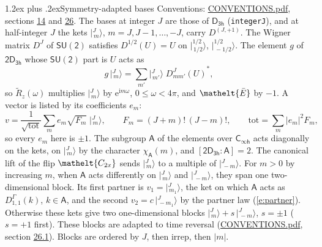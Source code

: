 \documentclass[10pt,a4paper]{article}
\makeatletter
\renewcommand\section{\@startsection{section}{1}{\z@}{-3ex plus -1ex minus -.2ex}%
  {1.2ex plus .2ex}{\normalfont\large\sffamily\bfseries\color{parttitle}}}
\numberwithin{equation}{section}
\newcommand{\eltfont}[1]{{\let\sigma\eltsigma\mathelt{#1}}}
\newcommand{\grp}[1]{\mathsf{#1}}
\newcommand{\elt}[1]{\eltfont{#1}}
\newcommand{\grpindex}[2]{[#1 : #2]}
\newcommand{\iunit}{\mathrm{i}}
\newcommand{\expe}{\mathrm{e}}
\newcommand{\irrJp}[2]{D^{(#1,#2)}}
\newcommand{\repD}[1]{D^{#1}}
\newcommand{\wignerD}[1]{D^{#1}}
\newcommand{\chiA}{\chi_{\grp{A}}}
\newcommand{\conj}[1]{{#1}^{*}}
\newcommand{\jm}[2]{\bigl\lvert{}^{#1}_{\,#2}\bigr\rangle}
\newcommand{\barred}[1]{\bar{#1}}
\newcommand{\lift}[1]{\tilde{#1}}
\makeatother
\begin{document}
\section{Symmetry-adapted bases}\label{s:bases}
Conventions: \href{../../CONVENTIONS.pdf}{CONVENTIONS.pdf}, sections \href{../../../rotation/CONVENTIONS.pdf\#conv.14}{14} and \href{../../CONVENTIONS.pdf\#conv.26}{26}.
\leavevmode\label{n:index.m}\label{n:vector.ket}The bases at integer $J$ are those of \href{../../../rotation/data/pdf/D3h.pdf}{$\grp{D_{3h}}$} (\texttt{integerJ}), and at half-integer $J$ the kets $\jm{J}{m}$, $m = J, J-1, \dots, -J$, carry $\irrJp{J}{+1}$. \label{n:matrix.wigner}The Wigner matrix $\wignerD{J}$ of $\grp{SU(2)}$ satisfies $\wignerD{1/2}(U) = U$ on $\jm{1/2}{1/2}$, $\jm{1/2}{-1/2}$. The element $g$ of $\grp{2D_{3h}}$ whose $\grp{SU(2)}$ part is $U$ acts as
\begin{equation}\label{e:action}g\,\jm{J}{m} = \sum_{m'} \jm{J}{m'}\; \conj{\wignerD{J}_{m m'}(U)},\end{equation}
so $\lift{R}_{z}(\omega)$ multiplies $\jm{J}{m}$ by $\expe^{\iunit m\omega}$, $0 \le \omega < 4\pi$, and $\elt{\barred{E}}$ by $-1$. \label{n:index.ketcoefficient}\label{n:vector.basis.symmetry}\label{n:index.ketweight}\label{n:index.total}A vector is listed by its coefficients $e_m$:
\begin{equation}\label{e:ket}v = \frac{1}{\sqrt{\mathrm{tot}}}\sum_m e_m\sqrt{F_m}\;\jm{J}{m},\qquad F_m = (J+m)!\,(J-m)!,\qquad \mathrm{tot} = \sum_m |e_m|^2F_m,\end{equation}
so every $e_m$ here is $\pm 1$.
\leavevmode\label{n:group.A}\label{n:function.character.abelian}The subgroup $\grp{A}$ of the elements over $\grp{C_{\infty h}}$ acts diagonally on the kets, on $\jm{J}{m}$ by the character $\chiA(m)$, and $\grpindex{\grp{2D_{3h}}}{\grp{A}} = 2$. The canonical lift of the flip $\elt{C_{2x}}$ sends $\jm{J}{m}$ to a multiple of $\jm{J}{-m}$. For $m > 0$ by increasing $m$, when $\grp{A}$ acts differently on $\jm{J}{m}$ and $\jm{J}{-m}$, they span one two-dimensional block. \label{n:index.partner.sign}Its first partner is $v_1 = \jm{J}{m_1}$, the ket on which $\grp{A}$ acts as $\repD{\Gamma}_{1,1}(k)$, $k \in \grp{A}$, and the second $v_2 = c\,\jm{J}{-m_1}$ by the partner law (\ref{e:partner}). \label{n:index.pair.sign}Otherwise these kets give two one-dimensional blocks $\jm{J}{m} + s\,\jm{J}{-m}$, $s = \pm 1$ ($s = +1$ first). These blocks are adapted to time reversal (\href{../../CONVENTIONS.pdf}{CONVENTIONS.pdf}, section \href{../../CONVENTIONS.pdf\#conv.26.1}{26.1}). Blocks are ordered by $J$, then irrep, then $|m|$.
\end{document}
